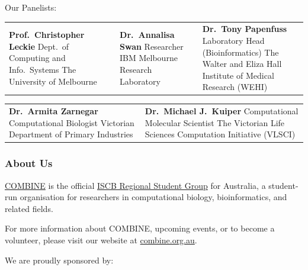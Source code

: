 \documentclass[10pt,]{article}
\begin{document}
\begin{minipage}[c]{\linewidth}
    \centering
    Our Panelists:\\[3ex]
    \begin{tabu}{X[c]X[c]X[c]}
        \textbf{Prof.~Christopher Leckie}\linebreak
            Dept.~of Computing and Info.~Systems\linebreak
            The University of Melbourne
        & \textbf{Dr.~Annalisa Swan}\linebreak
            Researcher\linebreak
            IBM Melbourne Research Laboratory
        & \textbf{Dr.~Tony Papenfuss}\linebreak
            Laboratory Head (Bioinformatics)\linebreak
            The Walter and Eliza Hall Institute of Medical Research (WEHI)
    \end{tabu}
    \vspace{3ex}
    \begin{tabu}{X[c]X[c]}
        \textbf{Dr.~Armita Zarnegar}\linebreak
            Computational Biologist\linebreak
            Victorian Department of Primary Industries
        & \textbf{Dr.~Michael J.~Kuiper}\linebreak
            Computational Molecular Scientist\linebreak
            The Victorian Life Sciences Computation Initiative (VLSCI)
    \end{tabu}
\end{minipage}


\subsubsection{About Us}

\href{http://www.combine.org.au}{COMBINE} is the official
\href{http://www.iscbsc.org/content/regional-student-groups}{ISCB
Regional Student Group} for Australia, a student-run organisation for
researchers in computational biology, bioinformatics, and related
fields.

For more information about COMBINE, upcoming events, or to become a
volunteer, please visit our website at
\href{http://www.combine.org.au}{combine.org.au}.

We are proudly sponsored by:
\end{document}
